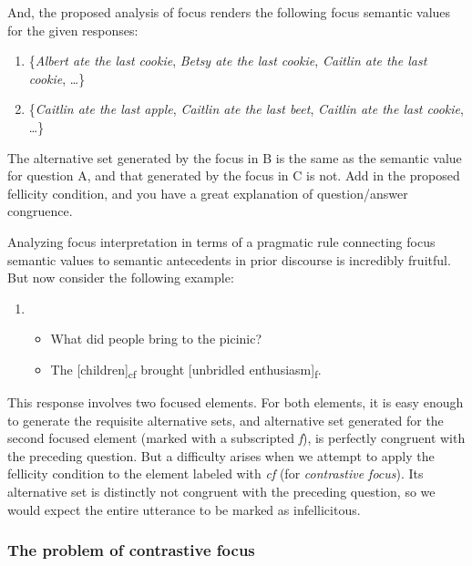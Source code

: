 \documentclass[letterpaper,]{article}
\begin{document}
And, the proposed analysis of focus renders the following focus semantic
values for the given responses:

\begin{enumerate}
\def\labelenumi{(\arabic{enumi})}
\setcounter{enumi}{2}
\item
  \{\emph{Albert ate the last cookie}, \emph{Betsy ate the last cookie},
  \emph{Caitlin ate the last cookie}, \ldots{}\}
\item
  \{\emph{Caitlin ate the last apple}, \emph{Caitlin ate the last beet},
  \emph{Caitlin ate the last cookie}, \ldots{}\}
\end{enumerate}

The alternative set generated by the focus in B is the same as the
semantic value for question A, and that generated by the focus in C is
not. Add in the proposed fellicity condition, and you have a great
explanation of question/answer congruence.

Analyzing focus interpretation in terms of a pragmatic rule connecting
focus semantic values to semantic antecedents in prior discourse is
incredibly fruitful. But now consider the following example:

\begin{enumerate}
\def\labelenumi{(\arabic{enumi})}
\setcounter{enumi}{4}
\item
  \begin{itemize}
  \itemsep1pt\parskip0pt
  \item
    What did people bring to the picinic?
  \item
    The {[}children{]}\textsubscript{cf} brought {[}unbridled
    enthusiasm{]}\textsubscript{f}.
  \end{itemize}
\end{enumerate}

This response involves two focused elements. For both elements, it is
easy enough to generate the requisite alternative sets, and alternative
set generated for the second focused element (marked with a subscripted
\emph{f}), is perfectly congruent with the preceding question. But a
difficulty arises when we attempt to apply the fellicity condition to
the element labeled with \emph{cf} (for \emph{contrastive focus}). Its
alternative set is distinctly not congruent with the preceding question,
so we would expect the entire utterance to be marked as infellicitous.

\subsubsection{The problem of contrastive
focus}\label{the-problem-of-contrastive-focus}
\end{document}
